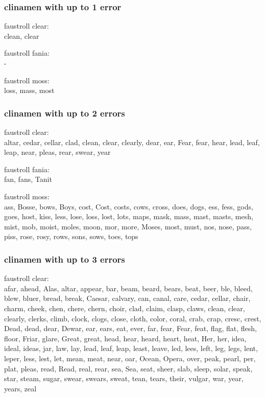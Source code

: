 {\subsubsection{clinamen with up to 1 error}
faustroll clear:\\
clean, clear

faustroll fania:\\
-

faustroll moss:\\
loss, mass, most

\subsubsection{clinamen with up to 2 errors}
faustroll clear:\\
altar, cedar, cellar, clad, clean, clear, clearly, dear, ear, Fear, fear, hear, lead, leaf, leap, near, pleas, rear, swear, year

faustroll fania:\\
fan, fans, Tanit

faustroll moss:\\
ass, Bosse, bows, Boys, cost, Cost, costs, cows, cross, does, dogs, ess, fess, gods, goes, host, kiss, less, lose, loss, lost, lots, maps, mask, mass, mast, masts, mesh, mist, mob, moist, moles, moon, mor, more, Moses, most, must, nos, nose, pass, piss, rose, rosy, rows, sons, sows, toes, tops

\subsubsection{clinamen with up to 3 errors}

faustroll clear:\\
afar, ahead, Alas, altar, appear, bar, beam, beard, bears, beat, beer, ble, bleed, blew, bluer, bread, break, Caesar, calvary, can, canal, care, cedar, cellar, chair, charm, cheek, chen, chere, chern, choir, clad, claim, clasp, claws, clean, clear, clearly, clerks, climb, clock, clogs, close, cloth, color, coral, crab, crap, cresc, crest, Dead, dead, dear, Dewar, ear, ears, eat, ever, far, fear, Fear, feat, flag, flat, flesh, floor, Friar, glare, Great, great, head, hear, heard, heart, heat, Her, her, idea, ideal, ideas, jar, law, lay, lead, leaf, leap, least, leave, led, lees, left, leg, legs, lent, leper, less, lest, let, mean, meat, near, oar, Ocean, Opera, over, peak, pearl, per, plat, pleas, read, Read, real, rear, sea, Sea, seat, sheer, slab, sleep, solar, speak, star, steam, sugar, swear, swears, sweat, tean, tears, their, vulgar, war, year, years, zeal

}
